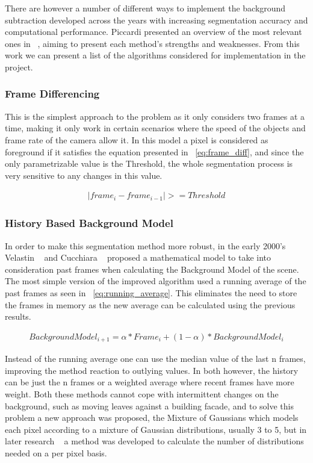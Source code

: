 There are however a number of different ways to implement the background subtraction developed across the years with increasing segmentation accuracy and computational performance. Piccardi presented an overview of the most relevant ones in ~\cite{piccardi_background_2004}, aiming to present each method's strengths and weaknesses. From this work we can present a list of the algorithms considered for implementation in the project.

\subsubsection{Frame Differencing}

This is the simplest approach to the problem as it only considers two frames at a time, making it only work in certain scenarios where the speed of the objects and frame rate of the camera allow it. In this model a pixel is considered as foreground if it satisfies the equation presented in ~\ref{eq:frame_diff}, and since the only parametrizable value is the Threshold, the whole segmentation process is very sensitive to any changes in this value.

\begin{eqnarray}
\label{eq:frame_diff}
\left | frame_{i} - frame_{i-1} \right | >= Threshold
\end{eqnarray}
\subsubsection{History Based Background Model}

In order to make this segmentation method more robust, in the early 2000's Velastin ~\cite{lo_automatic_2001} and Cucchiara ~\cite{cucchiara_detecting_2003} proposed a mathematical model to take into consideration past frames when calculating the Background Model of the scene. The most simple version of the improved algorithm used a running average of the past frames as seen in ~\ref{eq:running_average}. This eliminates the need to store the frames in memory as the new average can be calculated using the previous results.

\begin{eqnarray}
\label{eq:running_average}
BackgroundModel _{i+1} = \alpha * Frame_{i} + (1-\alpha)* BackgroundModel _{i}
\end{eqnarray}

Instead of the running average one can use the median value of the last n frames, improving the method reaction to outlying values. In both however, the history can be just the n frames or a weighted average where recent frames have more weight. Both these methods cannot cope with intermittent changes on the background, such as moving leaves against a building facade, and to solve this problem a new approach was proposed, the Mixture of Gaussians which models each pixel according to a mixture of Gaussian distributions, usually 3 to 5, but in later research ~\cite{zivkovic_improved_2004} a method was developed to calculate the number of distributions needed on a per pixel basis.

